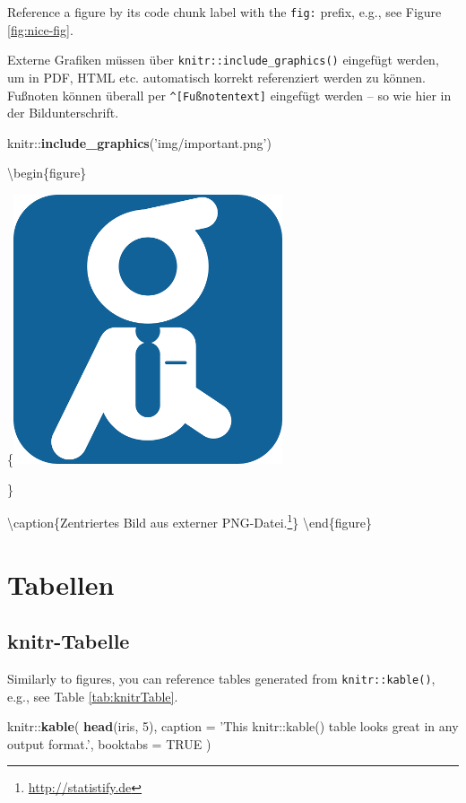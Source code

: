 \documentclass[]{book}
\makeatletter
\newenvironment{Shaded}{\begin{snugshade}}{\end{snugshade}}
\newcommand{\KeywordTok}[1]{\textcolor[rgb]{0.13,0.29,0.53}{\textbf{{#1}}}}
\newcommand{\DataTypeTok}[1]{\textcolor[rgb]{0.13,0.29,0.53}{{#1}}}
\newcommand{\DecValTok}[1]{\textcolor[rgb]{0.00,0.00,0.81}{{#1}}}
\newcommand{\StringTok}[1]{\textcolor[rgb]{0.31,0.60,0.02}{{#1}}}
\newcommand{\OtherTok}[1]{\textcolor[rgb]{0.56,0.35,0.01}{{#1}}}
\newcommand{\NormalTok}[1]{{#1}}
\let\rmarkdownfootnote\footnote%
\def\footnote{\protect\rmarkdownfootnote}
\newenvironment{kframe}{%
\medskip{}
\setlength{\fboxsep}{.8em}
 \def\at@end@of@kframe{}%
 \ifinner\ifhmode%
  \def\at@end@of@kframe{\end{minipage}}%
  \begin{minipage}{\columnwidth}%
 \fi\fi%
 \def\FrameCommand##1{\hskip\@totalleftmargin \hskip-\fboxsep
 \colorbox{shadecolor}{##1}\hskip-\fboxsep
     \hskip-\linewidth \hskip-\@totalleftmargin \hskip\columnwidth}%
 \MakeFramed {\advance\hsize-\width
   \@totalleftmargin\z@ \linewidth\hsize
   \@setminipage}}%
 {\par\unskip\endMakeFramed%
 \at@end@of@kframe}
\renewenvironment{Shaded}{\begin{kframe}}{\end{kframe}}
\theoremstyle{definition}
\theoremstyle{definition}
\theoremstyle{remark}
\makeatother
\begin{document}
Reference a figure by its code chunk label with the \texttt{fig:}
prefix, e.g., see Figure \ref{fig:nice-fig}.

Externe Grafiken müssen über \texttt{knitr::include\_graphics()}
eingefügt werden, um in PDF, HTML etc. automatisch korrekt referenziert
werden zu können. Fußnoten können überall per
\texttt{\^{}{[}Fußnotentext{]}} eingefügt werden -- so wie hier in der
Bildunterschrift.

\begin{Shaded}
\begin{Highlighting}[]
\NormalTok{knitr::}\KeywordTok{include_graphics}\NormalTok{(}\StringTok{'img/important.png'}\NormalTok{)}
\end{Highlighting}
\end{Shaded}

\textbackslash{}begin\{figure\}

\{\centering \includegraphics[width=0.328\linewidth]{img/important}

\}

\textbackslash{}caption\{Zentriertes Bild aus externer
PNG-Datei.\footnote{\url{http://statistify.de}}\}\label{fig:externalImage}
\textbackslash{}end\{figure\}

\section{Tabellen}\label{tabellen}

\subsection{knitr-Tabelle}\label{knitr-tabelle}

Similarly to figures, you can reference tables generated from
\texttt{knitr::kable()}, e.g., see Table \ref{tab:knitrTable}.

\begin{Shaded}
\begin{Highlighting}[]
\NormalTok{knitr::}\KeywordTok{kable}\NormalTok{(}
  \KeywordTok{head}\NormalTok{(iris, }\DecValTok{5}\NormalTok{), }\DataTypeTok{caption =} \StringTok{'This knitr::kable() table looks great in any output format.'}\NormalTok{,}
  \DataTypeTok{booktabs =} \OtherTok{TRUE}
\NormalTok{)}
\end{Highlighting}
\end{Shaded}
\end{document}
